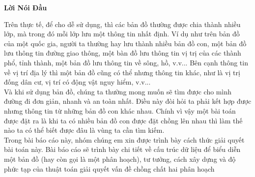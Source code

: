 \documentclass[15pt]{article}
\begin{document}
\begin{center}
{\huge \textbf{Lời Nói Đầu}} \\[1cm]
\end{center}
{\Large Trên thực tế, để cho dễ sử dụng, thì các bản đồ thường được chia thành nhiều lớp, mà trong đó mỗi lớp lưu một thông tin nhất định. Ví dụ như trên bản đồ của một quốc gia, người ta thường hay lưu thành nhiều bản đồ con, một bản đồ lưu thông tin đường giao thông, một bàn đồ lưu thông tin vị trị của các thành phổ, tỉnh thành, một bản đồ lưu thông tin về sông, hồ, v.v... Bên cạnh thông tin về vị trí địa lý thì một bản đồ cũng có thể nhưng thông tin khác, như là vị trị đống dân cư, vị trí có động vật nguy hiểm, v.v... \\

Và khi sử dụng bản đồ, chúng ta thường mong muốn sẽ tìm được cho mình đường đi đơn giản, nhanh và an toàn nhất. Điều này đòi hỏi ta phải kết hợp được nhưng thông tin từ những bản đồ con khác nhau. Chính vì vậy một bài toán được đặt ra là khi ta có nhiều bản đồ con được đặt chồng lên nhau thì làm thế nào ta có thể biết được đâu là vùng ta cần tìm kiếm. \\

Trong bài báo cáo này, nhóm chúng em xin được trình bày cách thức giải quyết bài toán này. Bài báo cáo sẽ trình bày chi tiết về cấu trúc dữ liệu để biểu diễn một bản đồ (hay còn gọi là một phân hoạch), tư tưởng, cách xây dựng và độ phức tạp của thuật toán giải quyết vấn đề chồng chất hai phân hoạch}
\newpage
\end{document}
